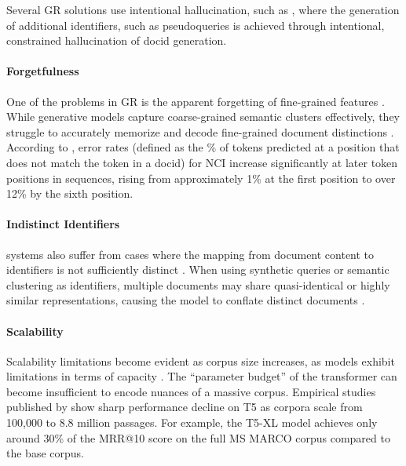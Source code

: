 Several %
GR solutions use intentional hallucination, such as \cite{yongqi-li-multiview-identifiers}, where the generation of additional identifiers, such as pseudoqueries is achieved through intentional, constrained hallucination of docid generation.

\paragraph{Forgetfulness}
\label{par:forgetfulness}

One of the problems in GR is the apparent forgetting of fine-grained features \cite{peiwen-yuan-generative-dense}. While generative models capture coarse-grained semantic clusters effectively, they struggle to accurately memorize and decode fine-grained document distinctions \cite{ye-wang-mindref-mimicking}. According to \citet{peiwen-yuan-generative-dense}, error rates (defined as the \% of tokens predicted at a position that does not match the token in a docid) for NCI \cite{yujing-wang-a-neural} increase significantly at later token positions in  sequences, rising from approximately 1\% at the first position to over 12\% by the sixth position.


\paragraph{Indistinct Identifiers}
\label{par:distinct-ids}

 systems also suffer from cases where the mapping from document content to identifiers is not sufficiently distinct \cite{zhang-multilevel-relevance}. When using synthetic queries \cite{yubao-tang-semanticenhanced-differentiable} %
or semantic clustering \cite{yi-tay-transformer-memory} as identifiers, multiple documents may share quasi-identical or highly similar representations, causing the model to conflate distinct documents \cite{cheng-descriptive-and,weiwei-sun-learning-to,xiaoxi-li-from-matching}.

\paragraph{Scalability}
\label{par:scalability}

Scalability limitations become evident as corpus size increases, as  models exhibit limitations in terms of capacity \cite{thong-nguyen-generative-retrieval,hansi-zeng-scalable-and}. The ``parameter budget'' of the transformer can become insufficient to encode nuances of a massive corpus. Empirical studies published by \citet{ronak-pradeep-how-does} show sharp performance decline on T5 \cite{colin-raffel-exploring-the} as corpora scale from 100,000 to 8.8 million passages. For example, the T5-XL model achieves only around 30\% of the MRR@10 score on the full MS MARCO corpus compared to the base corpus.

